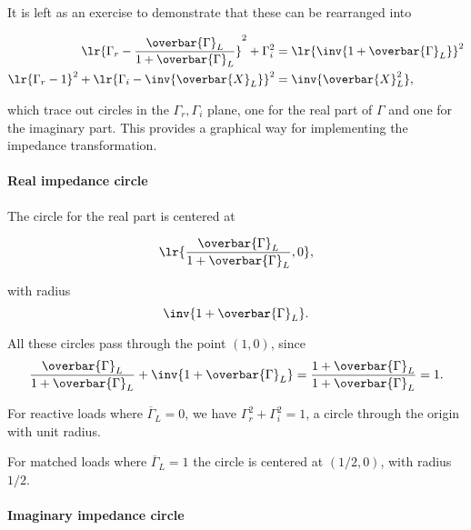 It is left as an exercise to demonstrate that these can be rearranged into

\begin{equation}\label{eqn:uwavesDeck5SmithChartCore:440}
\begin{aligned}
\lr{ \Gamma_r - \frac{\overbar{\Gamma}_L}{1 + \overbar{\Gamma}_L } }^2 + \Gamma_i^2 &= \lr{ \inv{1 + \overbar{\Gamma}_L }}^2 \\
\lr{ \Gamma_r - 1 }^2 + \lr{ \Gamma_i - \inv{\overbar{X}_L } }^2 &= \inv{\overbar{X}_L^2},
\end{aligned}
\end{equation}

which trace out circles in the \( \Gamma_r, \Gamma_i \) plane, one for the real part of \( \Gamma \) and one for the imaginary part.  This provides a graphical way for implementing the impedance transformation.  

\paragraph{Real impedance circle}

The circle for the real part is centered at 

\begin{dmath}\label{eqn:uwavesDeck5SmithChartCore:580}
\lr{ \frac{\overbar{\Gamma}_L}{1 + \overbar{\Gamma}_L }, 0 },
\end{dmath}

with radius
\begin{dmath}\label{eqn:uwavesDeck5SmithChartCore:600}
\inv{1 + \overbar{\Gamma}_L }.
\end{dmath}

All these circles pass through the point \( (1,0) \), since
\begin{dmath}\label{eqn:uwavesDeck5SmithChartCore:620}
\frac{\overbar{\Gamma}_L}{1 + \overbar{\Gamma}_L } + \inv{1 + \overbar{\Gamma}_L }
=
\frac{1 + \overbar{\Gamma}_L}{1 + \overbar{\Gamma}_L }
= 1.
\end{dmath}

For reactive loads where \( \overbar{\Gamma}_L = 0 \), we have \( \Gamma_r^2 + \Gamma_i^2 = 1 \), a circle through the origin with unit radius.

For matched loads where \( \overbar{\Gamma}_L = 1 \) the circle is centered at \( (1/2, 0) \), with radius \( 1/2 \).

\paragraph{Imaginary impedance circle}

